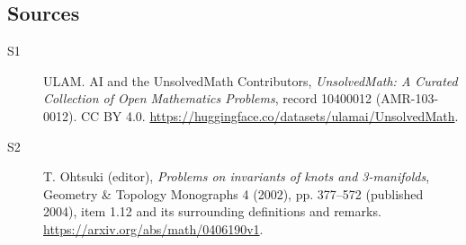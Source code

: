 \documentclass[11pt]{article}
\begin{document}
\subsection{Sources}
\begin{description}
\item[\hypertarget{source:10400012:1}{S1}] ULAM. AI and the UnsolvedMath Contributors, \emph{UnsolvedMath: A Curated Collection of Open Mathematics Problems}, record 10400012 (AMR-103-0012). CC BY 4.0. \url{https://huggingface.co/datasets/ulamai/UnsolvedMath}.
\item[\hypertarget{source:10400012:2}{S2}] T. Ohtsuki (editor), \emph{Problems on invariants of knots and 3-manifolds}, Geometry \& Topology Monographs 4 (2002), pp. 377--572 (published 2004), item 1.12 and its surrounding definitions and remarks. \url{https://arxiv.org/abs/math/0406190v1}.
\end{description}
\label{end:10400012}
\end{document}
